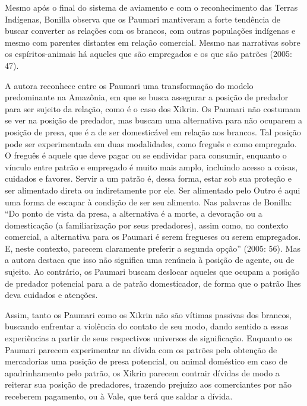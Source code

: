 Mesmo após o final do sistema de aviamento e com o reconhecimento das
Terras Indígenas, Bonilla observa que os Paumari mantiveram a forte
tendência de buscar converter as relações com os brancos, com outras
populações indígenas e mesmo com parentes distantes em relação
comercial. Mesmo nas narrativas sobre os espíritos-animais há aqueles
que são empregados e os que são patrões (2005: 47).

A autora reconhece entre os Paumari uma transformação do modelo
predominante na Amazônia, em que se busca assegurar a posição de
predador para ser sujeito da relação, como é o caso dos Xikrin. Os
Paumari não costumam se ver na posição de predador, mas buscam uma
alternativa para não ocuparem a posição de presa, que é a de ser
domesticável em relação aos brancos. Tal posição pode ser experimentada
em duas modalidades, como freguês e como empregado. O freguês é aquele
que deve pagar ou se endividar para consumir, enquanto o vínculo entre
patrão e empregado é muito mais amplo, incluindo acesso a coisas,
cuidados e favores. Servir a um patrão é, dessa forma, estar sob sua proteção e
ser alimentado direta ou indiretamente por ele. Ser alimentado pelo
Outro é aqui uma forma de escapar à condição de ser seu alimento. Nas
palavras de Bonilla: ``Do ponto de vista da presa, a alternativa é a
morte, a devoração ou a domesticação (a familiarização por seus
predadores), assim como, no contexto comercial, a alternativa para os
Paumari é serem fregueses ou serem empregados. E, neste contexto,
parecem claramente preferir a segunda opção'' (2005: 56). Mas a autora
destaca que isso não significa uma renúncia à posição de agente, ou de
sujeito. Ao contrário, os Paumari buscam deslocar aqueles que ocupam a
posição de predador potencial para a de patrão domesticador, de forma
que o patrão lhes deva cuidados e atenções. 

Assim, tanto os Paumari como os Xikrin não são vítimas passivas dos
brancos, buscando enfrentar a violência do contato de seu modo, dando
sentido a essas experiências a partir de seus respectivos universos de
significação. Enquanto os Paumari parecem experimentar na dívida com os
patrões pela obtenção de mercadorias uma posição de presa potencial, ou
animal doméstico em caso de apadrinhamento pelo patrão, os Xikrin
parecem contrair dívidas de modo a reiterar sua posição de predadores,
trazendo prejuízo aos comerciantes por não receberem pagamento, ou à
Vale, que terá que saldar a dívida.

